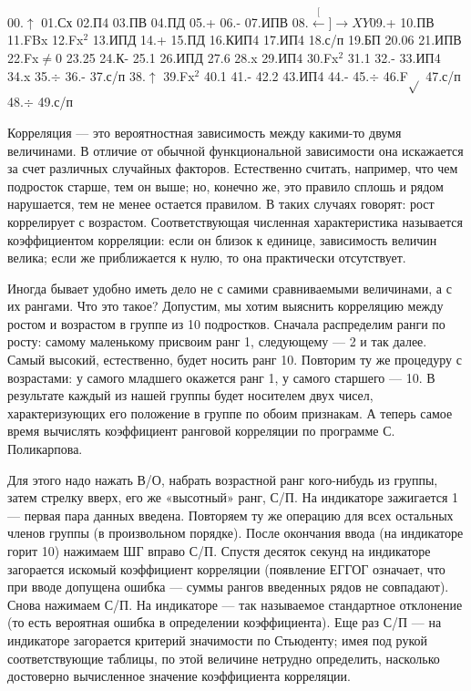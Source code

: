 \documentclass[11pt,a4paper,oneside]{article}
\def\XY{$\stackrel[\leftarrow]{\rightarrow}{XY}$}
\begin{document}
00.$\uparrow$ 01.Сх 02.П4 03.ПВ 04.ПД 05.+ 06.- 07.ИПВ 08.\XY 09.+ 10.ПВ 11.FBx 12.Fx$^{2}$ 13.ИПД 14.+ 15.ПД 16.КИП4
17.ИП4 18.с/п 19.БП 20.06 21.ИПВ 22.Fx$\neq$0 23.25 24.К- 25.1 26.ИПД 27.6 28.x 29.ИП4 30.Fx$^{2}$ 31.1 32.- 33.ИП4 34.x 35.$\div$ 36.- 37.с/п 38.$\uparrow$ 39.Fx$^{2}$ 40.1 41.- 42.2 43.ИП4 44.- 45.$\div$ 46.F$\sqrt{}$ 47.с/п 48.$\div$ 49.с/п

Корреляция — это вероятностная зависимость между какими-то двумя величинами. В отличие от обычной функциональной зависимости она искажается за счет различных случайных факторов. Естественно считать, например, что чем подросток старше, тем он выше; но, конечно же, это правило сплошь и рядом нарушается, тем не менее остается правилом. В таких случаях говорят: рост коррелирует с возрастом. Соответствующая численная характеристика называется коэффициентом корреляции: если он близок к единице, зависимость величин велика; если же приближается к нулю, то она практически отсутствует.

Иногда бывает удобно иметь дело не с самими сравниваемыми величинами, а с их рангами. Что это такое? Допустим, мы хотим выяснить корреляцию между ростом и возрастом в группе из 10 подростков. Сначала распределим ранги по росту: самому маленькому присвоим ранг 1, следующему — 2 и так далее. Самый высокий, естественно, будет носить ранг 10. Повторим ту же процедуру с возрастами: у самого младшего окажется ранг 1, у самого старшего — 10. В результате каждый из нашей группы будет носителем двух чисел, характеризующих его положение в группе по обоим признакам. А теперь самое время вычислять коэффициент ранговой корреляции по программе С. Поликарпова.

Для этого надо нажать В/О, набрать возрастной ранг кого-нибудь из группы, затем стрелку вверх, его же «высотный» ранг, С/П. На индикаторе зажигается 1 — первая пара данных введена. Повторяем ту же операцию для всех остальных членов группы (в произвольном порядке). После окончания ввода (на индикаторе горит 10) нажимаем ШГ вправо С/П. Спустя десяток секунд на индикаторе загорается искомый коэффициент корреляции (появление ЕГГОГ означает, что при вводе допущена ошибка — суммы рангов введенных рядов не совпадают). Снова нажимаем С/П. На индикаторе — так называемое стандартное отклонение (то есть вероятная ошибка в определении коэффициента). Еще раз С/П — на индикаторе загорается критерий значимости по Стьюденту; имея под рукой соответствующие таблицы, по этой величине нетрудно определить, насколько достоверно вычисленное значение коэффициента корреляции.
\end{document}
